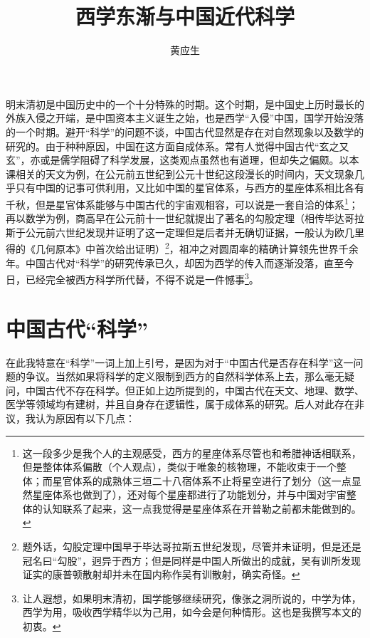 \documentclass{article}
\title{西学东渐与中国近代科学}
\author{黄应生}
\begin{document}
\maketitle
明末清初是中国历史中的一个十分特殊的时期。这个时期，是中国史上历时最长的外族入侵之开端，是中国资本主义诞生之始，也是西学“入侵”中国，国学开始没落的一个时期。避开“科学”的问题不谈，中国古代显然是存在对自然现象以及数学的研究的。由于种种原因，中国在这方面自成体系。常有人觉得中国古代“玄之又玄”，亦或是儒学阻碍了科学发展，这类观点虽然也有道理，但却失之偏颇。以本课相关的天文为例，在公元前五世纪到公元十世纪这段漫长的时间内，天文现象几乎只有中国的记事可供利用，又比如中国的星官体系，与西方的星座体系相比各有千秋，但是星官体系能够与中国古代的宇宙观相容，可以说是一套自洽的体系\footnote{这一段多少是我个人的主观感受，西方的星座体系尽管也和希腊神话相联系，但是整体体系偏散（个人观点），类似于唯象的核物理，不能收束于一个整体；而星官体系的成熟体三垣二十八宿体系不止将星空进行了划分（这一点显然星座体系也做到了），还对每个星座都进行了功能划分，并与中国对宇宙整体的认知联系了起来，这一点我觉得是星座体系在开普勒之前都未能做到的。}；再以数学为例，商高早在公元前十一世纪就提出了著名的勾股定理（相传毕达哥拉斯于公元前六世纪发现并证明了这一定理但是后者并无确切证据，一般认为欧几里得的《几何原本》中首次给出证明）\footnote{题外话，勾股定理中国早于毕达哥拉斯五世纪发现，尽管并未证明，但是还是冠名曰“勾股”，迥异于西方；但是同样是中国人所做出的成就，吴有训所发现证实的康普顿散射却并未在国内称作吴有训散射，确实奇怪。}，祖冲之对圆周率的精确计算领先世界千余年。中国古代对“科学”的研究传承已久，却因为西学的传入而逐渐没落，直至今日，已经完全被西方科学所代替，不得不说是一件憾事\footnote{让人遐想，如果明末清初，国学能够继续研究，像张之洞所说的，中学为体，西学为用，吸收西学精华以为己用，如今会是何种情形。这也是我撰写本文的初衷。}。
\section{中国古代“科学”}
在此我特意在“科学”一词上加上引号，是因为对于“中国古代是否存在科学”这一问题的争议。当然如果将科学的定义限制到西方的自然科学体系上去，那么毫无疑问，中国古代不存在科学。但正如上边所提到的，中国古代在天文、地理、数学、医学等领域均有建树，并且自身存在逻辑性，属于成体系的研究。后人对此存在非议，我认为原因有以下几点：
\end{document}
